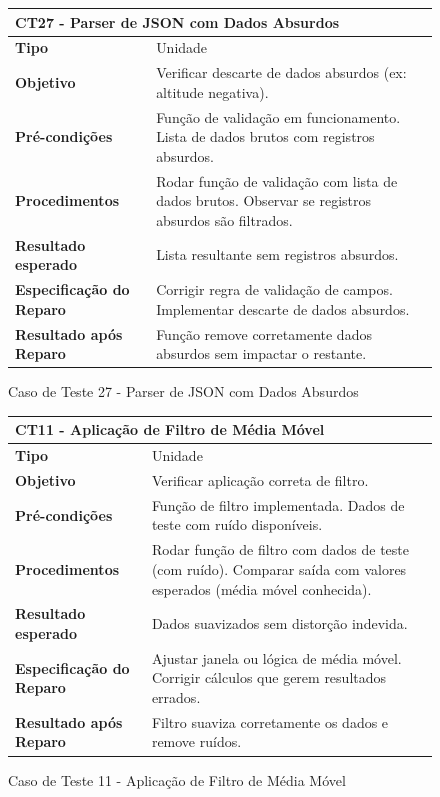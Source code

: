 \begin{figure}[H]
    \centering
\begin{longtable}{|p{}|p{}|}
\hline
\multicolumn{2}{|l|}{\textbf{CT27 - Parser de JSON com Dados Absurdos}} \\
\hline
\textbf{Tipo} & Unidade \\
\hline
\textbf{Objetivo} & Verificar descarte de dados absurdos (ex: altitude negativa). \\
\hline
\textbf{Pré-condições} & Função de validação em funcionamento.  Lista de dados brutos com registros absurdos. \\
\hline
\textbf{Procedimentos} & Rodar função de validação com lista de dados brutos.  Observar se registros absurdos são filtrados. \\
\hline
\textbf{Resultado esperado} & Lista resultante sem registros absurdos. \\
\hline
\textbf{Especificação do Reparo} & Corrigir regra de validação de campos.  Implementar descarte de dados absurdos. \\
\hline
\textbf{Resultado após Reparo} & Função remove corretamente dados absurdos sem impactar o restante. \\
\hline
\end{longtable}
\caption{Caso de Teste 27 - Parser de JSON com Dados Absurdos}
\label{fig_ct27_parser_json_dados_absurdos}
\end{figure}

\begin{figure}[H]
    \centering
\begin{longtable}{|p{}|p{}|}
\hline
\multicolumn{2}{|l|}{\textbf{CT11 - Aplicação de Filtro de Média Móvel}} \\
\hline
\textbf{Tipo} & Unidade \\
\hline
\textbf{Objetivo} & Verificar aplicação correta de filtro. \\
\hline
\textbf{Pré-condições} & Função de filtro implementada.  Dados de teste com ruído disponíveis.  \\
\hline
\textbf{Procedimentos} & Rodar função de filtro com dados de teste (com ruído).  Comparar saída com valores esperados (média móvel conhecida).  \\
\hline
\textbf{Resultado esperado} & Dados suavizados sem distorção indevida. \\
\hline
\textbf{Especificação do Reparo} & Ajustar janela ou lógica de média móvel.  Corrigir cálculos que gerem resultados errados. \\
\hline
\textbf{Resultado após Reparo} & Filtro suaviza corretamente os dados e remove ruídos. \\
\hline
\end{longtable}
\caption{Caso de Teste 11 - Aplicação de Filtro de Média Móvel}
\label{fig_ct11_filtro_media_movel}
\end{figure}

